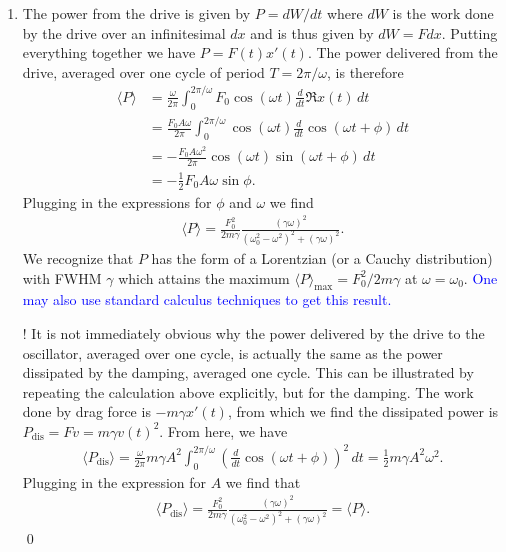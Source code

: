 \documentclass{article}
\theoremstyle{definition}
\newcommand{\f}[2]{\frac{#1}{#2}}
\newcommand{\lp}{\left(}
\newcommand{\rp}{\right)}
\begin{document}
\begin{enumerate}[label= \alph*)]
\begin{enumerate}[label=\roman*)]
	
	\item The power from the drive is given by $P = dW/dt$ where $dW$ is the work done by the drive over an infinitesimal $dx$ and is thus given by $dW = Fdx$.  Putting everything together we have $P = F(t)x'(t)$. The power delivered from the drive, averaged over one cycle of period $T = 2\pi / \omega$, is therefore
	\begin{align*}
	\langle P \rangle 
	&= \f{\omega}{2\pi}\int_{0}^{2\pi/\omega} F_0 \cos(\omega t) \f{d}{dt} \Re{x(t)} \,dt \\
	&= \f{F_0 A \omega}{2\pi}  \int_{0}^{2\pi/\omega} \cos(\omega t)  \f{d}{dt} \cos\lp \omega t + \phi \rp \,dt \\
	&= -\f{F_0 A \omega^2}{2\pi}  \cos(\omega t) \sin\lp \omega t + \phi \rp \,dt \\
	&= -\f{1}{2}F_0 A \omega \sin \phi.
	\end{align*} 
	Plugging in the expressions for $\phi$ and $\omega$ we find 
	\begin{align*}
	\langle P \rangle = \f{F_0^2 }{2m\gamma}\f{(\gamma\omega)^2}{(\omega_0^2 - \omega^2)^2 + (\gamma \omega)^2}.
	\end{align*}
	We recognize that $P$ has the form of a Lorentzian (or a Cauchy distribution) with FWHM $\gamma$ which attains the maximum $\langle P \rangle_\text{max} = F_0^2/2m\gamma$ at $\omega = \omega_0$.  \textcolor{blue}{One may also use standard calculus techniques to get this result.}
	
	
	$\boxed{!}$ It is not immediately obvious why the power delivered by the drive to the oscillator, averaged over one cycle, is actually the same as the power dissipated by the damping, averaged one cycle. This can be illustrated by repeating the calculation above explicitly, but for the damping. The work done by drag force is $-m\gamma x'(t)$, from which we find the dissipated power is $P_\text{dis} = Fv = m\gamma v(t)^2$. From here, we have
	\begin{align*}
	\langle P_\text{dis}\rangle = \f{\omega}{2\pi}m\gamma A^2\int_0^{2\pi/\omega} \lp \f{d}{dt}\cos(\omega t + \phi)\rp^2\,dt = \f{1}{2}m\gamma A^2\omega^2.
	\end{align*}
	Plugging in the expression for $A$ we find that
	\begin{align*}
	\langle P_\text{dis}\rangle = \f{F_0^2}{2m\gamma} \f{(\gamma\omega)^2}{(\omega_0^2 - \omega^2)^2 + (\gamma \omega)^2} = \langle P \rangle. 
	\end{align*}
	\qed
	
	
	

\end{enumerate}
\end{enumerate}
\end{document}
